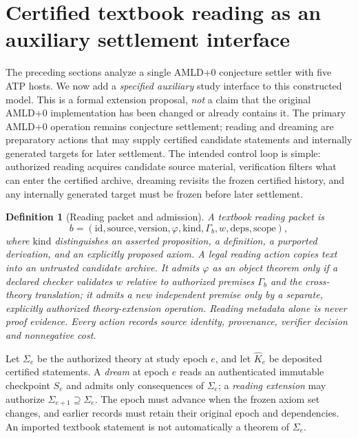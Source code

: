 \documentclass[11pt]{article}
\newtheorem{definition}[theorem]{Definition}
\begin{document}
\section{Certified textbook reading as an auxiliary settlement interface}
The preceding sections analyze a single AMLD+0 conjecture settler with five ATP hosts. We now add a \emph{specified auxiliary} study interface to this constructed model. This is a formal extension proposal, \emph{not} a claim that the original AMLD+0 implementation has been changed or already contains it. The primary AMLD+0 operation remains conjecture settlement; reading and dreaming are preparatory actions that may supply certified candidate statements and internally generated targets for later settlement.
The intended control loop is simple: authorized reading acquires candidate source material, verification filters what can enter the certified archive, dreaming revisits the frozen certified history, and any internally generated target must be frozen before later settlement.
\begin{definition}[Reading packet and admission]
A textbook reading packet is\[b=(\mathrm{id},\mathrm{source},\mathrm{version},\varphi,\mathrm{kind},\Gamma_b,w,\mathrm{deps},\mathrm{scope}),\]where $\mathrm{kind}$ distinguishes an asserted proposition, a definition, a purported derivation, and an explicitly proposed axiom. A legal \emph{reading} action copies text into an untrusted candidate archive. It admits $\varphi$ as an object theorem only if a declared checker validates $w$ relative to authorized premises $\Gamma_b$ and the cross-theory translation; it admits a new independent premise only by a separate, explicitly authorized \emph{theory-extension} operation. Reading metadata alone is never proof evidence. Every action records source identity, provenance, verifier decision and nonnegative cost.
\end{definition}
Let $\Sigma_e$ be the authorized theory at study epoch $e$, and let $\widehat K_e$ be deposited certified statements. A \emph{dream} at epoch $e$ reads an authenticated immutable checkpoint $S_e$ and admits only consequences of $\Sigma_e$; a \emph{reading extension} may authorize $\Sigma_{e+1}\supseteq\Sigma_e$. The epoch must advance when the frozen axiom set changes, and earlier records must retain their original epoch and dependencies. An imported textbook statement is not automatically a theorem of $\Sigma_e$.
\end{document}
